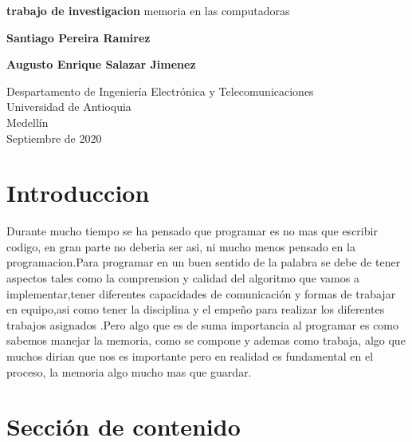 \documentclass{article}
\begin{document}
\begin{titlepage}
    \begin{center}
        \vspace*{1cm}
            
        \Huge
        \textbf{trabajo de investigacion}
        \vspace{0.5cm}
        \LARGE
        memoria en las computadoras
            
        \vspace{1.5cm}
            
        \textbf{Santiago Pereira Ramirez}
        
        
        \vspace{1 cm}
        
        \textbf{Augusto Enrique Salazar Jimenez}
            
        \vfill
            
        \vspace{0.8cm}
            
        \Large
        Despartamento de Ingeniería Electrónica y Telecomunicaciones\\
        Universidad de Antioquia\\
        Medellín\\
        Septiembre de 2020
            
    \end{center}
\end{titlepage}

\tableofcontents

\section{Introduccion}
Durante mucho tiempo se ha pensado que programar es no mas que  escribir codigo, en gran parte no deberia ser asi, ni mucho menos pensado en la programacion.Para programar en un buen sentido de la palabra se debe de tener aspectos tales como la comprension y calidad del algoritmo que vamos a implementar,tener diferentes capacidades de comunicación 
y formas de trabajar en equipo,asi como tener la disciplina y el empeño para realizar los diferentes trabajos asignados .Pero algo que es de suma importancia al programar es como sabemos manejar la memoria, como se compone y ademas como trabaja, algo que muchos dirian que nos es importante pero en realidad es fundamental en el proceso, la memoria algo mucho mas que guardar.


\section{Sección de contenido} \label{contenido}
\end{document}
